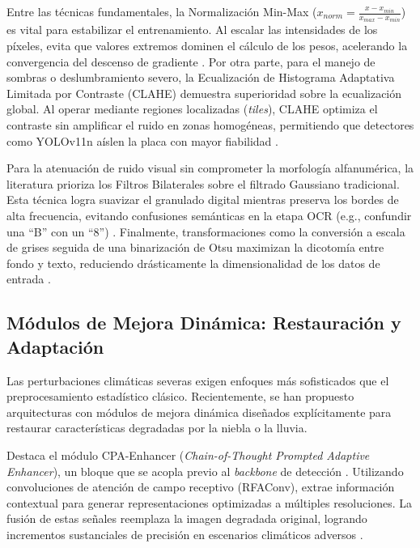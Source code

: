 Entre las técnicas fundamentales, la Normalización Min-Max ($x_{norm} = \frac{x - x_{min}}{x_{max} - x_{min}}$) 
es vital para estabilizar el entrenamiento. Al escalar las intensidades de los píxeles, 
evita que valores extremos dominen el cálculo de los pesos, acelerando la convergencia 
del descenso de gradiente \parencite{kuyunsaDeepLearningEnhancedAutomatic2025}. 
Por otra parte, para el manejo de sombras o deslumbramiento severo, la Ecualización 
de Histograma Adaptativa Limitada por Contraste (CLAHE) demuestra superioridad sobre la 
ecualización global. Al operar mediante regiones localizadas (\textit{tiles}), CLAHE 
optimiza el contraste sin amplificar el ruido en zonas homogéneas, permitiendo que 
detectores como YOLOv11n aíslen la placa con mayor fiabilidad 
\parencite{suhartoComparativeEvaluationYOLObased2025}.

Para la atenuación de ruido visual sin comprometer la morfología alfanumérica, la 
literatura prioriza los Filtros Bilaterales sobre el filtrado Gaussiano tradicional. 
Esta técnica logra suavizar el granulado digital mientras preserva los bordes de alta 
frecuencia, evitando confusiones semánticas en la etapa OCR (e.g., confundir una ``B'' 
con un ``8'') \parencite{kuyunsaDeepLearningEnhancedAutomatic2025, xiongLicensePlateRecognition2026}. 
Finalmente, transformaciones como la conversión a escala de grises seguida de una 
binarización de Otsu maximizan la dicotomía entre fondo y texto, reduciendo drásticamente 
la dimensionalidad de los datos de entrada 
\parencite{kuyunsaDeepLearningEnhancedAutomatic2025, suhartoComparativeEvaluationYOLObased2025}.

\subsection{Módulos de Mejora Dinámica: Restauración y Adaptación}

Las perturbaciones climáticas severas exigen enfoques más sofisticados que el preprocesamiento 
estadístico clásico. Recientemente, se han propuesto arquitecturas con módulos de mejora 
dinámica diseñados explícitamente para restaurar características degradadas por la niebla 
o la lluvia.

Destaca el módulo CPA-Enhancer (\textit{Chain-of-Thought Prompted Adaptive Enhancer}), un bloque 
que se acopla previo al \textit{backbone} de detección \parencite{xiongLicensePlateRecognition2026}. 
Utilizando convoluciones de atención de campo receptivo (RFAConv), extrae información 
contextual para generar representaciones optimizadas a múltiples resoluciones. La fusión de 
estas señales reemplaza la imagen degradada original, logrando incrementos sustanciales de 
precisión en escenarios climáticos adversos \parencite{xiongLicensePlateRecognition2026}.

